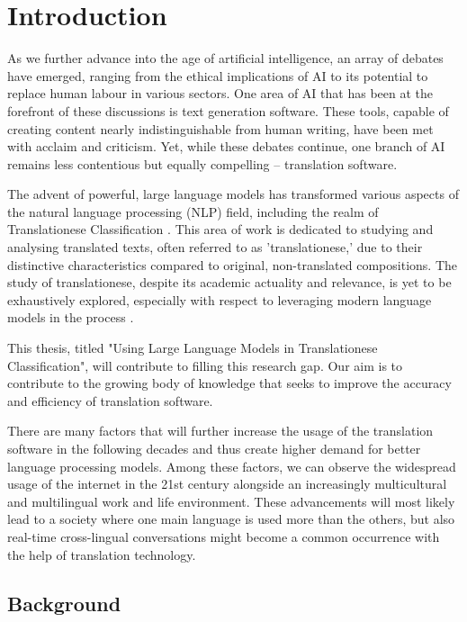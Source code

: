 \chapter{Introduction}

As we further advance into the age of artificial intelligence, an array of debates have emerged, ranging from the ethical implications of AI to its potential to replace human labour in various sectors. One area of AI that has been at the forefront of these discussions is text generation software. These tools, capable of creating content nearly indistinguishable from human writing, have been met with acclaim and criticism. Yet, while these debates continue, one branch of AI remains less contentious but equally compelling – translation software.

The advent of powerful, large language models has transformed various aspects of the natural language processing (NLP) field, including the realm of Translationese Classification \cite{2_translationese}. This area of work is dedicated to studying and analysing translated texts, often referred to as 'translationese,' due to their distinctive characteristics compared to original, non-translated compositions. The study of translationese, despite its academic actuality and relevance, is yet to be exhaustively explored, especially with respect to leveraging modern language models in the process \cite{2_4_translationese}. 

This thesis, titled "Using Large Language Models in Translationese Classification", will contribute to filling this research gap.
Our aim is to contribute to the growing body of knowledge that seeks to improve the accuracy and efficiency of translation software.

There are many factors that will further increase the usage of the translation software in the following decades and thus create higher demand for better language processing models. Among these factors, we can observe the widespread usage of the internet in the 21st century alongside an increasingly multicultural and multilingual work and life environment. These advancements will most likely lead to a society where one main language is used more than the others, but also real-time cross-lingual conversations might become a common occurrence with the help of translation technology.

\section{Background}

